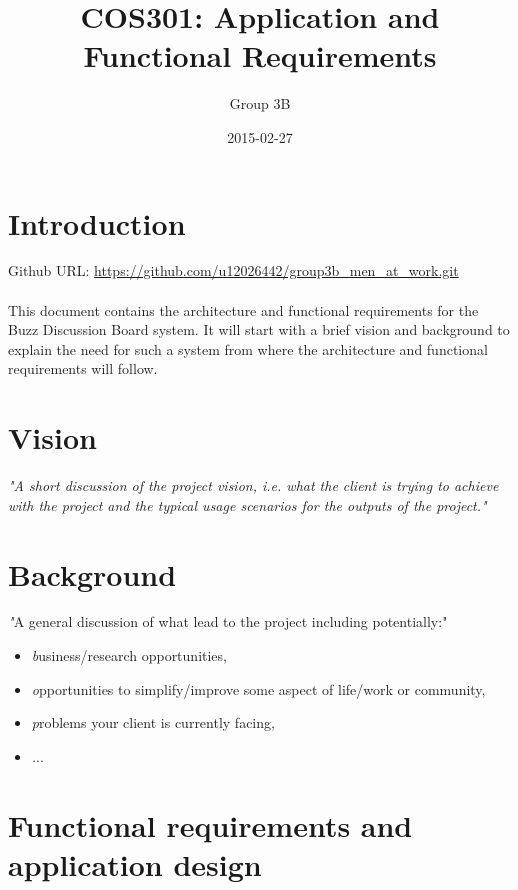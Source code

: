 \documentclass[a4paper, 10pt, oneside]{report}
\title{COS301: Application and Functional Requirements}
\date{2015-02-27}
\author{Group 3B}
\begin{document}
\maketitle
{}

\newpage
{}

\tableofcontents 

\newpage
{}


\chapter{Introduction}

Github URL: \url{https://github.com/u12026442/group3b_men_at_work.git}
\\
\\
This document contains the architecture and functional requirements for the Buzz Discussion Board system. It will start with a brief  vision and background to explain the need for such a system from where the architecture and functional requirements will follow.


\chapter{Vision}

\textit{"A short discussion of the project vision, i.e. what the client is trying to achieve with the project
and the typical usage scenarios for the outputs of the project."}

\chapter{Background}

\textit "A general discussion of what lead to the project including potentially:"

\begin{itemize}
\item \textit business/research opportunities,
\item \textit opportunities to simplify/improve some aspect of life/work or community,
\item \textit problems your client is currently facing,
\item \textit ...
\end{itemize}

\chapter{ Functional requirements and application design}
\end{document}
